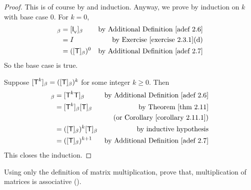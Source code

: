 \begin{proof}
This is of course by  and induction.
Anyway, we prove by induction on \(k\) with base case \(0\).
For \(k = 0\),
\begin{align*}
    [\T^0]_{\beta} & = [\ITRANV]_{\beta} & \text{by \ADEF{2.6}} \\
                   & = I & \text{by \EXEC{2.3.1}(d)} \\
                   & = ([\T]_{\beta})^0 & \text{by \ADEF{2.7}}
\end{align*}
So the base case is true.

Suppose \([\textsf{T}^k]_{\beta} = ([\textsf{T}]_{\beta})^k\) for some integer \(k \ge 0\).
Then
\begin{align*}
    [\T^{k + 1}]_{\beta} & = [\T^k \T]_{\beta} & \text{by \ADEF{2.6}} \\
                         & = [\T^k]_{\beta} [\T]_{\beta} & \text{by \THM{2.11}} \\
                         & & \text{(or \CORO{2.11.1})} \\
                         & = ([\T]_{\beta})^k [\T]_{\beta} & \text{by inductive hypothesis} \\
                         & = ([\T]_{\beta})^{k + 1} & \text{by \ADEF{2.7}}
\end{align*}
This closes the induction.
\end{proof}

\begin{exercise} \label{exercise 2.3.19}
Using only the definition of matrix multiplication, prove that, multiplication of matrices is associative ().
\end{exercise}

